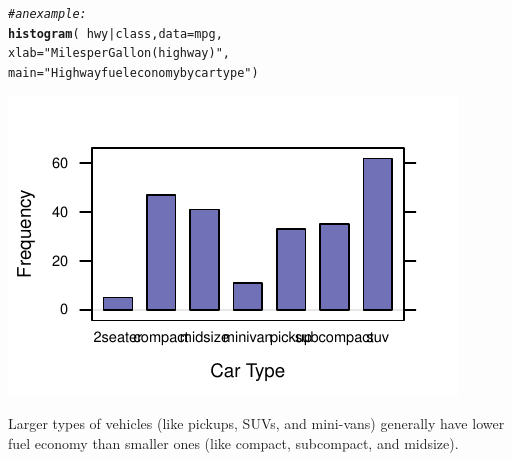 \documentclass[twoside]{book}\usepackage[]{graphicx}\usepackage[]{xcolor}
\makeatletter
\def\maxwidth{ %
  \ifdim\Gin@nat@width>\linewidth
    \linewidth
  \else
    \Gin@nat@width
  \fi
}
\newcommand{\hlstr}[1]{\textcolor[rgb]{0.192,0.494,0.8}{#1}}%
\newcommand{\hlcom}[1]{\textcolor[rgb]{0.678,0.584,0.686}{\textit{#1}}}%
\newcommand{\hlopt}[1]{\textcolor[rgb]{0,0,0}{#1}}%
\newcommand{\hlstd}[1]{\textcolor[rgb]{0.345,0.345,0.345}{#1}}%
\newcommand{\hlkwc}[1]{\textcolor[rgb]{0.333,0.667,0.333}{#1}}%
\newcommand{\hlkwd}[1]{\textcolor[rgb]{0.737,0.353,0.396}{\textbf{#1}}}%
\newenvironment{kframe}{%
 \def\at@end@of@kframe{}%
 \ifinner\ifhmode%
  \def\at@end@of@kframe{\end{minipage}}%
  \begin{minipage}{\columnwidth}%
 \fi\fi%
 \def\FrameCommand##1{\hskip\@totalleftmargin \hskip-\fboxsep
 \colorbox{shadecolor}{##1}\hskip-\fboxsep
     \hskip-\linewidth \hskip-\@totalleftmargin \hskip\columnwidth}%
 \MakeFramed {\advance\hsize-\width
   \@totalleftmargin\z@ \linewidth\hsize
   \@setminipage}}%
 {\par\unskip\endMakeFramed%
 \at@end@of@kframe}
\newenvironment{knitrout}{}{} %
\newcounter{example}[section]
\makeatother
\begin{document}
\begin{solution}
\begin{knitrout}
\color{fgcolor}\begin{kframe}
\begin{alltt}
\hlcom{#an example:}
\hlkwd{histogram}\hlstd{(}\hlopt{~} \hlstd{hwy} \hlopt{|} \hlstd{class ,} \hlkwc{data}\hlstd{=mpg,}
          \hlkwc{xlab}\hlstd{=}\hlstr{"Miles per Gallon (highway)"}\hlstd{,}
          \hlkwc{main}\hlstd{=}\hlstr{"Highway fuel economy by car type"}\hlstd{)}
\end{alltt}
\end{kframe}

{\centering \includegraphics[width=\maxwidth]{figures/fig-unnamed-chunk-27-1} 

}



\end{knitrout}
Larger types of vehicles (like pickups, SUVs, and mini-vans) generally have lower fuel economy than smaller ones (like compact, subcompact, and midsize).
\end{solution}
\end{document}
